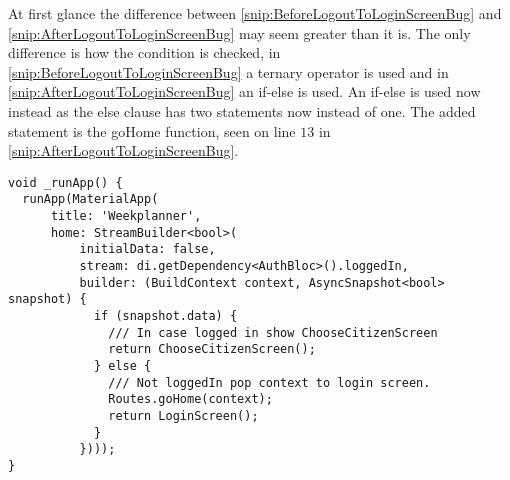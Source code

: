 At first glance the difference between \autoref{snip:BeforeLogoutToLoginScreenBug} and \autoref{snip:AfterLogoutToLoginScreenBug} may seem greater than it is.
The only difference is how the condition is checked, in \autoref{snip:BeforeLogoutToLoginScreenBug} a ternary operator is used and in \autoref{snip:AfterLogoutToLoginScreenBug} an if-else is used.
An if-else is used now instead as the else clause has two statements now instead of one.
The added statement is the goHome function, seen on line $13$ in \autoref{snip:AfterLogoutToLoginScreenBug}.

\begin{lstlisting}[label={snip:AfterLogoutToLoginScreenBug}, caption={The \_runApp function after the bug fix(notice the call to the goHome function)}, captionpos=b, language=CSharp] 
void _runApp() {
  runApp(MaterialApp(
      title: 'Weekplanner',
      home: StreamBuilder<bool>(
          initialData: false,
          stream: di.getDependency<AuthBloc>().loggedIn,
          builder: (BuildContext context, AsyncSnapshot<bool> snapshot) {
            if (snapshot.data) {
              /// In case logged in show ChooseCitizenScreen
              return ChooseCitizenScreen();
            } else {
              /// Not loggedIn pop context to login screen.
              Routes.goHome(context);
              return LoginScreen();
            }
          })));
}
\end{lstlisting}
